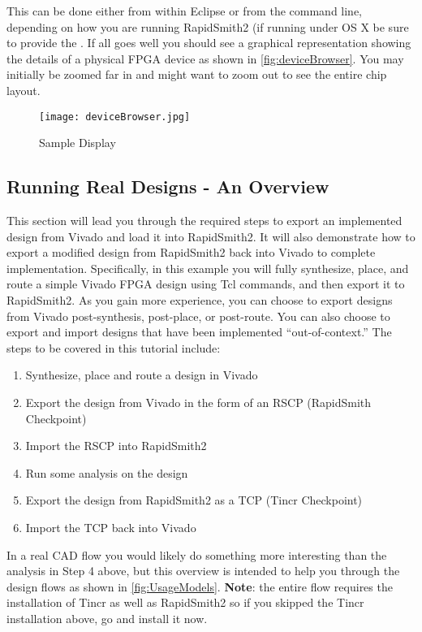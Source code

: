 \noindent This can be done either from within Eclipse or from the command line,
depending on how you are running RapidSmith2 (if running under OS X be sure to provide the
. If all goes well you should see a
graphical representation showing the details of a physical FPGA device as shown
in \autoref{fig:deviceBrowser}.  You may initially be zoomed far in and might
want to zoom out to see the entire chip layout.

\begin{figure}[H]
\centering
\texttt{[image: deviceBrowser.jpg]}
\caption{ Sample Display}
\label{fig:deviceBrowser}
\end{figure}

\subsection{Running Real Designs - An Overview}
This section will lead you through the required steps to export an implemented 
design from Vivado and load it into RapidSmith2. It will also demonstrate how to
export a modified design from RapidSmith2 back into Vivado to complete
implementation. Specifically, in this example you will fully synthesize, place,
and route a simple Vivado FPGA design using Tcl commands, and then export it to
RapidSmith2. As you gain more experience, you can choose to export designs from
Vivado post-synthesis, post-place, or post-route. You can also choose to export
and import designs that have been implemented ``out-of-context.'' The
steps to be covered in this tutorial include:

\begin{enumerate}
  \item Synthesize, place and route a design in Vivado
  \item  Export the design from Vivado in the form of an RSCP (RapidSmith
  Checkpoint)
  \item Import the RSCP  into RapidSmith2
  \item Run some analysis on the design
  \item Export the design from RapidSmith2 as a TCP (Tincr Checkpoint)
  \item Import the TCP back into Vivado
\end{enumerate}

\noindent In a real CAD flow you would likely do something more interesting
than the analysis in Step 4 above, but this overview is intended to help you
through the design flows as shown in \autoref{fig:UsageModels}. \textbf{Note}:
the entire flow requires the installation of Tincr as well as RapidSmith2 so if
you skipped the Tincr installation above, go and install it now.

